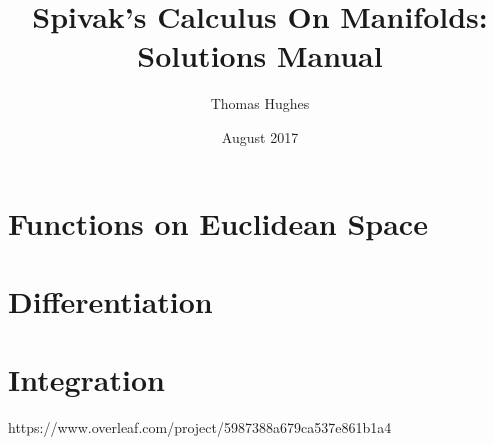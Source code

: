 \documentclass{report}
\title{Spivak's Calculus On Manifolds: Solutions Manual}
\author{Thomas Hughes}
\date{August 2017}
\begin{document}
\maketitle

\chapter{Functions on Euclidean Space}


\chapter{Differentiation}


\chapter{Integration}
https://www.overleaf.com/project/5987388a679ca537e861b1a4
\end{document}
